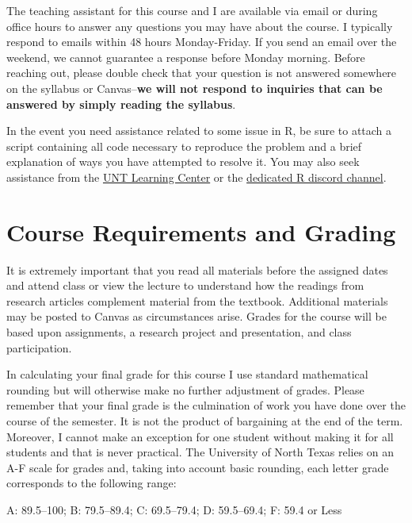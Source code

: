 \documentclass[12pt,]{article}
\begin{document}
\noindent The teaching assistant for this course and I are available via
email or during office hours to answer any questions you may have about
the course. I typically respond to emails within 48 hours Monday-Friday.
If you send an email over the weekend, we cannot guarantee a response
before Monday morning. Before reaching out, please double check that
your question is not answered somewhere on the syllabus or
Canvas--\textbf{we will not respond to inquiries that can be answered by
simply reading the syllabus}.

In the event you need assistance related to some issue in R, be sure to
attach a script containing all code necessary to reproduce the problem
and a brief explanation of ways you have attempted to resolve it. You
may also seek assistance from the
\href{https://learningcenter.unt.edu/}{UNT Learning Center} or the
\href{https://discord.gg/ggm9dnAYBE}{dedicated R discord channel}.

\hypertarget{course-requirements-and-grading}{%
\section{Course Requirements and
Grading}\label{course-requirements-and-grading}}

\noindent It is extremely important that you read all materials before
the assigned dates and attend class or view the lecture to understand
how the readings from research articles complement material from the
textbook. Additional materials may be posted to Canvas as circumstances
arise. Grades for the course will be based upon assignments, a research
project and presentation, and class participation.

In calculating your final grade for this course I use standard
mathematical rounding but will otherwise make no further adjustment of
grades. Please remember that your final grade is the culmination of work
you have done over the course of the semester. It is not the product of
bargaining at the end of the term. Moreover, I cannot make an exception
for one student without making it for all students and that is never
practical. The University of North Texas relies on an A-F scale for
grades and, taking into account basic rounding, each letter grade
corresponds to the following range:

\begin{center}
A: 89.5--100;
B: 79.5--89.4;
C: 69.5--79.4;
D: 59.5--69.4;
F: 59.4 or Less 
\end{center}
\end{document}
